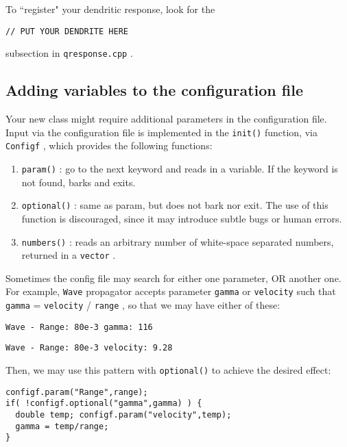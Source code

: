 \documentclass[12pt,a4paper]{article}
\newcommand{\type}[1]{ {\small\small\tt #1} }
\begin{document}
To ``register" your dendritic response, look for the
\begin{lstlisting}
// PUT YOUR DENDRITE HERE
\end{lstlisting}
subsection in \type{qresponse.cpp}.

\subsection{Adding variables to the configuration file}
\label{sec:init}

Your new class might require additional parameters in the configuration file. Input via the configuration file is implemented in the \type{init()} function, via \type{Configf}, which provides the following functions:
	\begin{enumerate}
		\item \type{param()}: go to the next keyword and reads in a variable. If the keyword is not found, barks and exits.
		\item \type{optional()}: same as param, but does not bark nor exit. The use of this function is discouraged, since it may introduce subtle bugs or human errors.
		\item \type{numbers()}: reads an arbitrary number of white-space separated numbers, returned in a \type{vector}.
	\end{enumerate}

	Sometimes the config file may search for either one parameter, OR another one. For example, \type{Wave} propagator accepts parameter \type{gamma} or \type{velocity} such that \type{gamma} = \type{velocity}/\type{range}, so that we may have either of these:
\begin{lstlisting}
Wave - Range: 80e-3 gamma: 116
\end{lstlisting}

\begin{lstlisting}
Wave - Range: 80e-3 velocity: 9.28
\end{lstlisting}
	
Then, we may use this pattern with \type{optional()} to achieve the desired effect:
\begin{lstlisting}
configf.param("Range",range);
if( !configf.optional("gamma",gamma) ) {
  double temp; configf.param("velocity",temp);
  gamma = temp/range;
}
\end{lstlisting}
\end{document}
